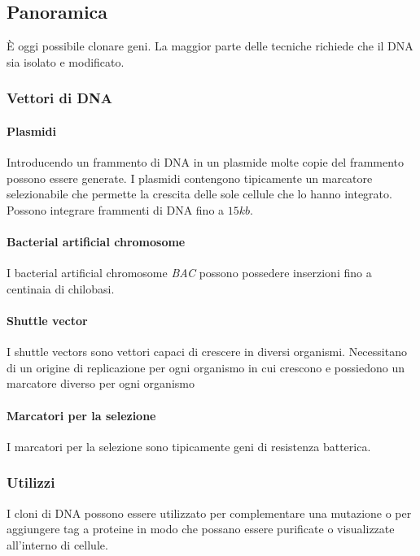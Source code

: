 	\subsection{Panoramica}
	\`E oggi possibile clonare geni.
	La maggior parte delle tecniche richiede che il DNA sia isolato e modificato.

		\subsubsection{Vettori di DNA}

			\paragraph{Plasmidi}
			Introducendo un frammento di DNA in un plasmide molte copie del frammento possono essere generate.
			I plasmidi contengono tipicamente un marcatore selezionabile che permette la crescita delle sole cellule che lo hanno integrato.
			Possono integrare frammenti di DNA fino a $15kb$.

			\paragraph{Bacterial artificial chromosome}
			I bacterial artificial chromosome \emph{BAC} possono possedere inserzioni fino a centinaia di chilobasi.

			\paragraph{Shuttle vector}
			I shuttle vectors sono vettori capaci di crescere in diversi organismi.
			Necessitano di un origine di replicazione per ogni organismo in cui crescono e possiedono un marcatore diverso per ogni organismo

			\paragraph{Marcatori per la selezione}
			I marcatori per la selezione sono tipicamente geni di resistenza batterica.
	
		\subsubsection{Utilizzi}
		I cloni di DNA possono essere utilizzato per complementare una mutazione o per aggiungere tag a proteine in modo che possano essere purificate o visualizzate all'interno di cellule.


